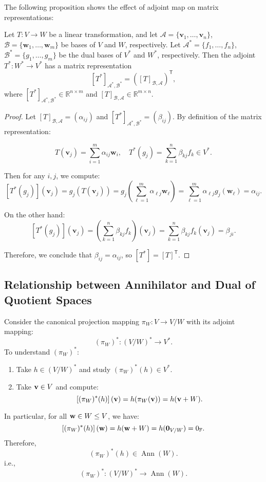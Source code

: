 The following proposition shows the effect of adjoint map on matrix representations:
\begin{proposition}
Let \( T : V \to W \) be a linear transformation, and let \( \mathcal{A} = \{ \mathbf{v}_1, \dots, \mathbf{v}_n \} \), \( \mathcal{B} = \{ \mathbf{w}_1, \dots, \mathbf{w}_m \} \) be bases of \( V \) and \( W \), respectively. Let \( \mathcal{A}^* = \{ f_1, \dots, f_n \} \), \( \mathcal{B}^* = \{ g_1, \dots, g_m \} \) be the dual bases of \( V^* \) and \( W^* \), respectively. Then the adjoint \( T^* : W^* \to V^* \) has a matrix representation
\[
[T^*]_{\mathcal{A}^*, \mathcal{B}^*} = \left([T]_{\mathcal{B}, \mathcal{A}}\right)^{\mathsf{T}},
\]
where \([T^*]_{\mathcal{A}^*, \mathcal{B}^*} \in \mathbb{R}^{n \times m}\) and \([T]_{\mathcal{B}, \mathcal{A}} \in \mathbb{R}^{m \times n}\).
\end{proposition}

\begin{proof}
Let \([T]_{\mathcal{B}, \mathcal{A}} = (\alpha_{ij})\) and \([T^*]_{\mathcal{A}^*, \mathcal{B}^*} = (\beta_{ij})\). By definition of the matrix representation:

\[
T(\mathbf{v}_j) = \sum_{i=1}^{m} \alpha_{ij} \mathbf{w}_i, \quad T^*(g_j) = \sum_{k=1}^{n} \beta_{kj} f_k \in V^*.
\]

Then for any \( i, j \), we compute:
\[
[T^*(g_j)](\mathbf{v}_j) = g_j(T(\mathbf{v}_j)) = g_j\left( \sum_{\ell=1}^{m} \alpha_{\ell j} \mathbf{w}_\ell \right) = \sum_{\ell=1}^{m} \alpha_{\ell j} g_j(\mathbf{w}_\ell) = \alpha_{ij}.
\]

On the other hand:
\[
[T^*(g_j)](\mathbf{v}_j) = \left( \sum_{k=1}^{n} \beta_{kj} f_k \right)(\mathbf{v}_j) = \sum_{k=1}^{n} \beta_{kj} f_k(\mathbf{v}_j) = \beta_{ji}.
\]

Therefore, we conclude that \( \beta_{ij} = \alpha_{ij} \), so \( [T^*] = [T]^{\mathsf{T}} \).
\end{proof}

\subsection{Relationship between Annihilator and Dual of Quotient Spaces}

\begin{example}
Consider the canonical projection mapping \( \pi_W : V \to V/W \) with its adjoint mapping:
\[
(\pi_W)^* : (V/W)^* \to V^*.
\]
To understand \( (\pi_W)^* \):
\begin{enumerate}
  \item Take \( h \in (V/W)^* \) and study \( (\pi_W)^*(h) \in V^* \).
  \item Take \( {\bf v} \in V \) and compute:
  \[
  \left[(\pi_W)^*(h)\right]({\bf v}) = h(\pi_W({\bf v})) = h({\bf v} + W).
  \]
\end{enumerate}
In particular, for all \( {\bf w} \in W \leq V \), we have:
  \[
  \left[(\pi_W)^*(h)\right]({\bf w}) = h({\bf w} + W) = h({\bf 0}_{V/W}) = 0_{\mathbb{F}}.
  \]
  Therefore, 
  \[
  (\pi_W)^*(h) \in \operatorname{Ann}(W).
  \]
  i.e., 
  \[(\pi_W)^*: (V/W)^* \to \operatorname{Ann}(W).\]
\end{example}

